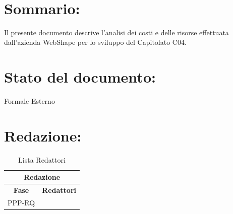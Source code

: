 \begin{center} %
	\begin{Huge}	
				\textbf{\TITOLODOC}
			\\
	\end{Huge}
\end{center}

\section*{\LARGE Sommario:}
Il presente documento descrive l'analisi dei costi e delle risorse effettuata dall'azienda WebShape per lo sviluppo del Capitolato C04.

\indent \indent

\section*{\LARGE Stato del documento:}
\indent \indent
	Formale Esterno

\section*{\LARGE Redazione:}
	\begin{table}[!h]
		\begin{center}
			\begin{tabular}
				{|c|c|}
				\hline
				\multicolumn{2}{|c|}{ \textbf{Redazione} } \\
				\hline
				\textbf{Fase} & \textbf{Redattori} \\
				\hline
				\multirow{2}{*}{PPP-RQ} & \\
										& \\
				\hline
			\end{tabular}
			\caption{Lista Redattori} %
			\label{tabredazione}
		\end{center}
	\end{table}
	
	
